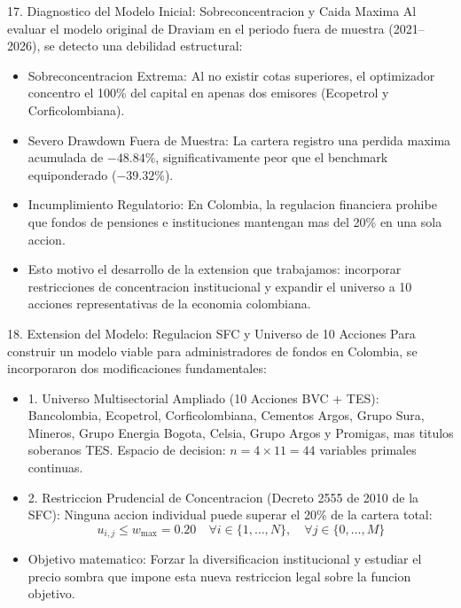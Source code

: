 \documentclass[aspectratio=169,10pt]{beamer}
\begin{document}
\begin{frame}{17. Diagnostico del Modelo Inicial: Sobreconcentracion y Caida Maxima}
  Al evaluar el modelo original de Draviam en el periodo fuera de muestra (2021--2026), se detecto una debilidad estructural:
  \vspace{0.3cm}
  \begin{itemize}
    \item Sobreconcentracion Extrema:
    Al no existir cotas superiores, el optimizador concentro el 100\% del capital en apenas dos emisores (Ecopetrol y Corficolombiana).
    \vspace{0.2cm}
    \item Severo Drawdown Fuera de Muestra:
    La cartera registro una perdida maxima acumulada de $-48.84\%$, significativamente peor que el benchmark equiponderado ($-39.32\%$).
    \vspace{0.2cm}
    \item Incumplimiento Regulatorio:
    En Colombia, la regulacion financiera prohibe que fondos de pensiones e instituciones mantengan mas del 20\% en una sola accion.
    \vspace{0.2cm}
    \item Esto motivo el desarrollo de la extension que trabajamos: incorporar restricciones de concentracion institucional y expandir el universo a 10 acciones representativas de la economia colombiana.
  \end{itemize}
\end{frame}

\begin{frame}{18. Extension del Modelo: Regulacion SFC y Universo de 10 Acciones}
  Para construir un modelo viable para administradores de fondos en Colombia, se incorporaron dos modificaciones fundamentales:
  \vspace{0.3cm}
  \begin{itemize}
    \item 1. Universo Multisectorial Ampliado (10 Acciones BVC + TES):
    Bancolombia, Ecopetrol, Corficolombiana, Cementos Argos, Grupo Sura, Mineros, Grupo Energia Bogota, Celsia, Grupo Argos y Promigas, mas titulos soberanos TES.
    Espacio de decision: $n = 4 \times 11 = 44$ variables primales continuas.
    \vspace{0.3cm}
    \item 2. Restriccion Prudencial de Concentracion (Decreto 2555 de 2010 de la SFC):
    Ninguna accion individual puede superar el 20\% de la cartera total:
    \begin{equation*}
      u_{i,j} \le w_{\max} = 0.20 \quad \forall i \in \{1, \dots, N\}, \quad \forall j \in \{0, \dots, M\}
    \end{equation*}
    \item Objetivo matematico: Forzar la diversificacion institucional y estudiar el precio sombra que impone esta nueva restriccion legal sobre la funcion objetivo.
  \end{itemize}
\end{frame}
\end{document}
